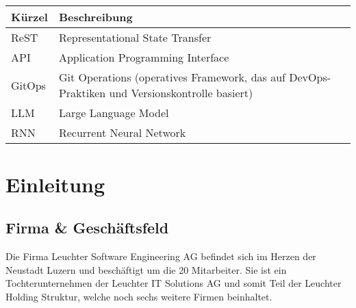 \documentclass{bpraxis}
\begin{document}
\thispagestyle{empty}
~\vspace{5cm}

\\[5mm]
\\[3mm]
\\[3mm]

\newpage


{\renewcommand{\arraystretch}{1.3}
  \begin{tabularx}{\linewidth}{p{4cm}X}
    \hline
    \rowcolor{lightgray}
    \textbf{Kürzel} & \textbf{Beschreibung}                                                                         \\\hline
    ReST            & Representational State Transfer                                                               \\\hline
    API             & Application Programming Interface                                                             \\\hline
    GitOps          & Git Operations (operatives Framework, das auf DevOps-Praktiken und Versionskontrolle basiert) \\\hline
    LLM             & Large Language Model                                                                          \\\hline
    RNN             & Recurrent Neural Network                                                                      \\\hline
  \end{tabularx}
}

\bigbreak

{
  \hypersetup{linkcolor=black}
  \setlength{\parskip}{0pt}
  \tableofcontents
}

\newpage


\section{Einleitung}

\subsection{Firma \& Geschäftsfeld}

Die Firma Leuchter Software Engineering AG befindet sich im Herzen der Neustadt Luzern und beschäftigt um die 20 Mitarbeiter.
Sie ist ein Tochterunternehmen der Leuchter IT Solutions AG und somit Teil der Leuchter Holding Struktur, welche noch sechs weitere Firmen beinhaltet.
\end{document}
